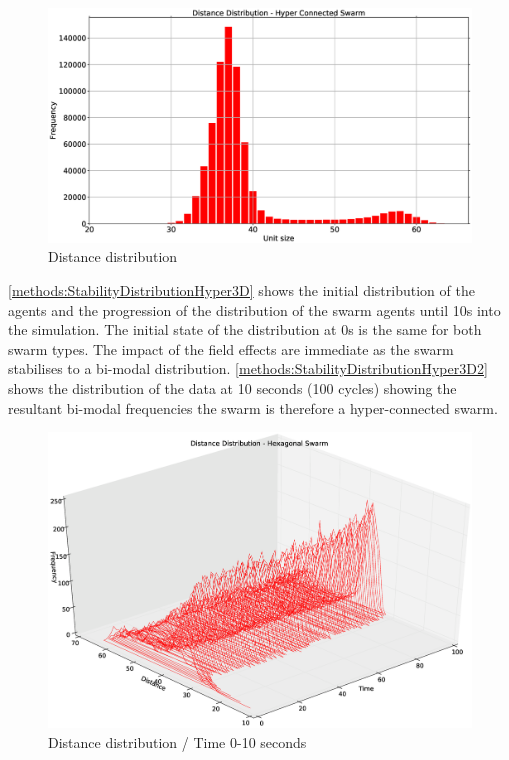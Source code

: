 \begin{figure}[H]
\begin{center}
\includegraphics[width=13cm]{CHAPTER-5/figures/StabilityDistibutionHyper}
\end{center}
\caption{Distance distribution\label{methods:StabilityDistributionHyper}}
\end{figure}

\autoref{methods:StabilityDistributionHyper3D} shows the initial distribution of the agents and the progression of the distribution of the swarm agents until 10s into the simulation. The initial state of the distribution at 0s is the same for both swarm types. The impact of the field effects are immediate as the swarm stabilises to a bi-modal distribution. \autoref{methods:StabilityDistributionHyper3D2} shows the distribution of the data at 10 seconds (100 cycles) showing the resultant bi-modal frequencies the swarm is therefore a hyper-connected swarm.
\begin{figure}[H]
\begin{center}
\includegraphics[width=13cm]{CHAPTER-5/figures/StabilityDistibutionHyper3D}
\end{center}
\caption{Distance distribution / Time 0-10 seconds\label{methods:StabilityDistributionHyper3D}}
\end{figure}

